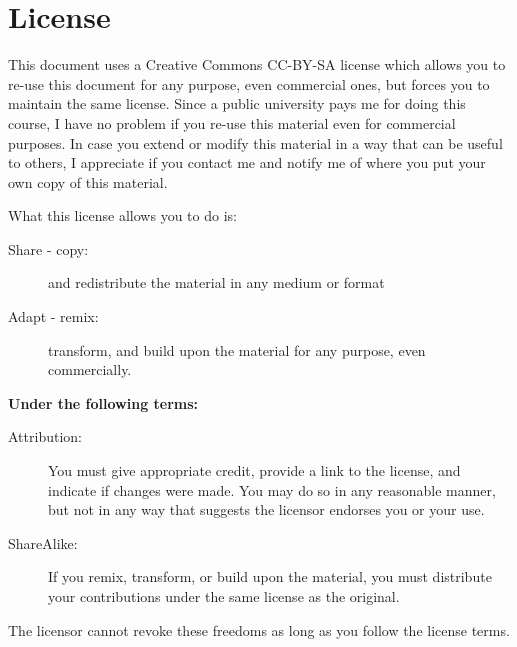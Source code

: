 \chapter*{License}
This document uses a Creative Commons CC-BY-SA license which allows you to re-use this document for any purpose, even commercial ones, but forces you to maintain the same license. Since a public university pays me for doing this course, I have no problem if you re-use this material even for commercial purposes. In case you extend or modify this material in a way that can be useful to others, I appreciate if you contact me and notify me of where you put your own copy of this material. 

What this license allows you to do is:

\begin{description}
\item[Share - copy:] and redistribute the material in any medium or format
\item[Adapt - remix:] transform, and build upon the material for any purpose, even commercially.
\end{description}

\textbf{Under the following terms:}


\begin{description}
\item[Attribution:] You must give appropriate credit, provide a link to the license, and indicate if changes were made. You may do so in any reasonable manner, but not in any way that suggests the licensor endorses you or your use.
\item[ShareAlike:]If you remix, transform, or build upon the material, you must distribute your contributions under the same license as the original. 
\end{description}
The licensor cannot revoke these freedoms as long as you follow the license terms.
%
%
\doclicenseThis
